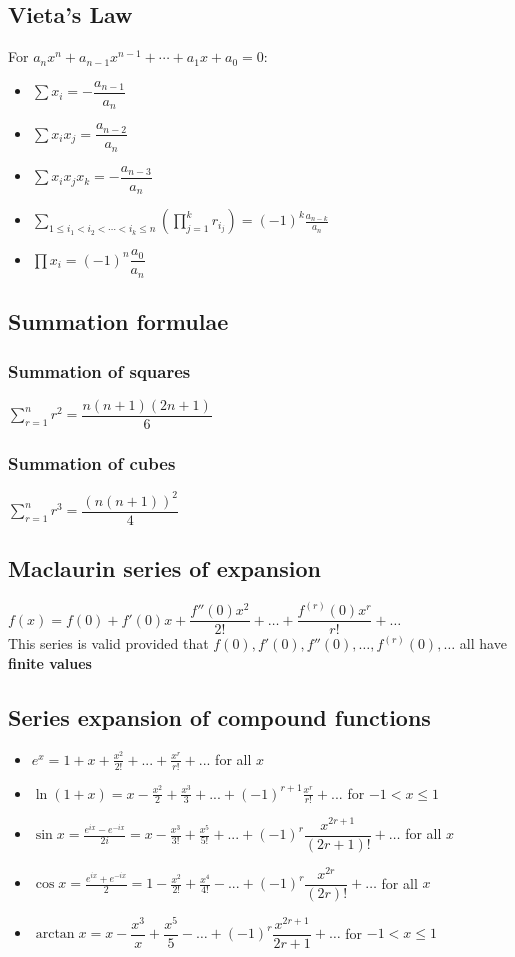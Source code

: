 \subsection{Vieta's Law}
For $a_{n}x^{n}+a_{n-1}x^{n-1}+\cdots +a_{1}x+a_{0}=0$:
\begin{itemize}
	\item $\sum x_i=-\dfrac{a_{n-1}}{a_n}$
	\item $\sum x_ix_j=\dfrac{a_{n-2}}{a_n}$
	\item $\sum x_ix_jx_k = -\dfrac{a_{n-3}}{a_n}$
	\item $\sum _{1\leq i_{1}<i_{2}<\cdots <i_{k}\leq n}\left(\prod _{j=1}^{k}r_{i_{j}}\right)=(-1)^{k}{\frac {a_{n-k}}{a_{n}}}$
	\item $\prod x_i=(-1)^n\dfrac{a_0}{a_n}$
\end{itemize}
\subsection{Summation formulae}
\subsubsection{Summation of squares}
$\sum_{r=1}^{n} r^2=\dfrac{n(n+1)(2n+1)}{6}$ 
\subsubsection{Summation of cubes}
$\sum_{r=1}^{n} r^3=\dfrac{(n(n+1))^2}{4}$
\subsection{Maclaurin series of expansion}
$f(x)=f(0)+f'(0)x+\dfrac{f''(0)x^2}{2!}+\dots+\dfrac{f^{(r)}(0)x^r}{r!}+\dots$\\
This series is valid provided that $f(0), f'(0), f''(0),\dots,f^{(r)}(0),\dots$ all have \textbf{finite values}

\subsection{Series expansion of compound functions}
\begin{itemize}
	\item $e^{x}=1+x+\frac{x^{2}}{2!}+...+\frac{x^{r}}{r!}+...$ for all $x$
	\item $\ln(1+x) = x - \frac{x^{2}}{2} + \frac{x^{3}}{3} + ... + (-1)^{r+1}\frac{x^{r}}{r!} +...$ for $-1<x\leq1$
	\item $\sin x = \frac{e^{ix}-e^{-ix}}{2i}=x-\frac{x^{3}}{3!}+\frac{x^{5}}{5!}+...+(-1)^r\dfrac{x^{2r+1}}{(2r+1)!}+\dots$ for all $x$
	\item $\cos x = \frac{e^{ix}+e^{-ix}}{2}=1-\frac{x^{2}}{2!}+\frac{x^{4}}{4!}-...+(-1)^r\dfrac{x^{2r}}{(2r)!}+\dots$ for all $x$
	\item $\arctan x = x-\dfrac{x^3}{x}+\dfrac{x^5}{5}-\dots+(-1)^r\dfrac{x^{2r+1}}{2r+1}+\dots$ for $-1<x\leq1$
\end{itemize}
